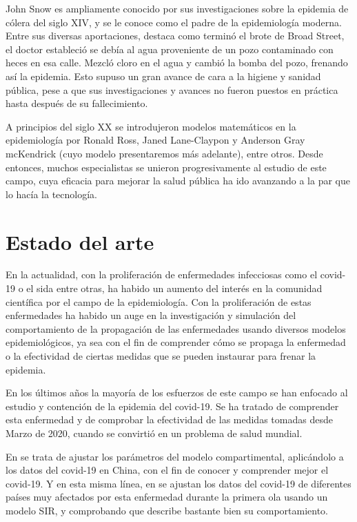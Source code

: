 John Snow es ampliamente conocido por sus investigaciones sobre la epidemia de cólera del siglo XIV, y se le conoce como el padre de la epidemiología moderna. Entre sus diversas aportaciones, destaca como terminó el brote de Broad Street, el doctor estableció se debía al agua proveniente de un pozo contaminado con heces en esa calle. Mezcló cloro en el agua y cambió la bomba del pozo, frenando así la epidemia. Esto supuso un gran avance de cara a la higiene y sanidad pública, pese a que sus investigaciones y avances no fueron puestos en práctica hasta después de su fallecimiento.

A principios del siglo XX se introdujeron modelos matemáticos en la epidemiología por Ronald Ross, Janed Lane-Claypon y Anderson Gray mcKendrick (cuyo modelo presentaremos más adelante), entre otros. Desde entonces, muchos especialistas se unieron progresivamente al estudio de este campo, cuya eficacia para mejorar la salud pública ha ido avanzando a la par que lo hacía la tecnología.

\section{Estado del arte}

En la actualidad, con la proliferación de enfermedades infecciosas como el covid-19 o el sida entre otras, ha habido un aumento del interés en la comunidad científica por el campo de la epidemiología. Con la proliferación de estas enfermedades ha habido un auge en la investigación y simulación del comportamiento de la propagación de las enfermedades usando diversos modelos epidemiológicos, ya sea con el fin de comprender cómo se propaga la enfermedad o la efectividad de ciertas medidas que se pueden instaurar para frenar la epidemia.

En los últimos años la mayoría de los esfuerzos de este campo se han enfocado al estudio y contención de la epidemia del covid-19. Se ha tratado de comprender esta enfermedad y de comprobar la efectividad de las medidas tomadas desde Marzo de 2020, cuando se convirtió en un problema de salud mundial.

En \cite{demongeotSIEpidemicModel} se trata de ajustar los parámetros del modelo compartimental, aplicándolo a los datos del covid-19 en China, con el fin de conocer y comprender mejor el covid-19. Y en esta misma línea, en \cite{enrique_amaro} se ajustan los datos del covid-19 de diferentes países muy afectados por esta enfermedad durante la primera ola usando un modelo SIR, y comprobando que describe bastante bien su comportamiento.

